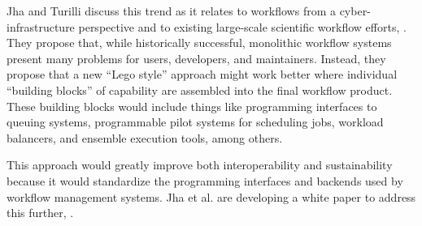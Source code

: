 Jha and Turilli discuss this trend as it relates to workflows from a 
cyber-infrastructure perspective and to existing large-scale scientific workflow
efforts, \cite{jha_building_2016}. They propose that, while historically
successful, monolithic workflow systems present many problems for users,
developers, and maintainers. Instead, they propose that a new ``Lego style''
approach might work better where individual ``building blocks'' of capability
are assembled into the final workflow product. These building blocks would
include things like programming interfaces to queuing systems, programmable
pilot systems for scheduling jobs, workload balancers, and ensemble execution
tools, among others.

This approach would greatly improve both interoperability and sustainability
because it would standardize the programming interfaces and backends used by
workflow management systems. Jha et al. are developing a white paper to address
this further, \cite{jha_towards_2016}.

